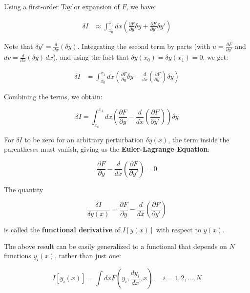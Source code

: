 Using a first-order Taylor expansion of $F$, we have:

\begin{align}
    \delta I &\approx \int_{x_0}^{x_1} dx \left( \frac{\partial F}{\partial y} \delta y + \frac{\partial F}{\partial y'} \delta y' \right)
\end{align}

Note that $\delta y' = \frac{d}{dx}(\delta y)$. Integrating the second term by parts 
(with $u = \frac{\partial F}{\partial y'}$ and $dv = \frac{d}{dx}(\delta y)\, dx$), and 
using the fact that $\delta y(x_0) = \delta y(x_1) = 0$, we get:

\begin{align}
    \delta I &= \int_{x_0}^{x_1} dx \left( \frac{\partial F}{\partial y} \delta y - \frac{d}{dx} \left(\frac{\partial F}{\partial y'}\right) \delta y \right)
\end{align}

Combining the terms, we obtain:

\begin{equation}
    \delta I = \int_{x_0}^{x_1} dx \left( \frac{\partial F}{\partial y} - \frac{d}{dx} \left(\frac{\partial F}{\partial y'}\right) \right) \delta y
\end{equation}

For $\delta I$ to be zero for an arbitrary perturbation $\delta y(x)$, the term inside 
the parentheses must vanish, giving us the \textbf{Euler-Lagrange Equation}:

\begin{equation}
    \frac{\partial F}{\partial y} - \frac{d}{dx} \left(\frac{\partial F}{\partial y'}\right) = 0
\end{equation}

The quantity

\begin{equation}
    \frac{\delta I}{\delta y(x)} = \frac{\partial F}{\partial y} - \frac{d}{dx} \left(\frac{\partial F}{\partial y'}\right)
\end{equation}

is called the \textbf{functional derivative} of $I[y(x)]$ with respect to $y(x)$.

The above result can be easily generalized to a functional that depends on $N$ functions
$y_i(x)$, rather than just one:

\begin{equation}
    I[y_i(x)] = \int dx F(y_i, \frac{dy_i}{dx}, x), \quad i = 1, 2, \dots, N
    \label{eq:functional_multiple_functions}
\end{equation}

